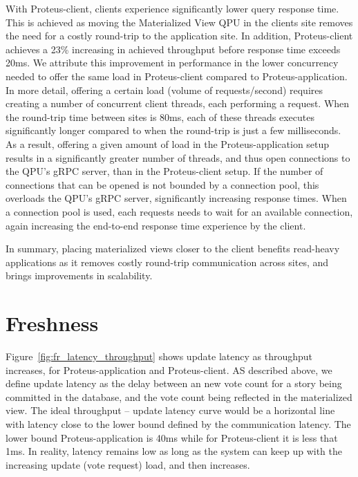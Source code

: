 With Proteus-client, clients experience significantly lower query response time.
This is achieved as moving the Materialized View QPU in the clients site removes the need for a costly round-trip to the
application site.
In addition, Proteus-client achieves a 23\% increasing in achieved throughput before response time exceeds 20ms.
We attribute this improvement in performance in the lower concurrency needed to offer the same load in Proteus-client
compared to Proteus-application.
In more detail, offering a certain load (volume of requests/second) requires creating a number of concurrent client threads,
each performing a request.
When the round-trip time between sites is 80ms, each of these threads executes significantly longer compared to
when the round-trip is just a few milliseconds.
As a result, offering a given amount of load in the Proteus-application setup results in a significantly greater number
of threads, and thus open connections to the QPU's gRPC server, than in the Proteus-client setup.
If the number of connections that can be opened is not bounded by a connection pool, this overloads the QPU's gRPC server,
significantly increasing response times.
When a connection pool is used, each requests needs to wait for an available connection,
again increasing the end-to-end response time experience by the client.

\medskip
\noindent
In summary, placing materialized views closer to the client benefits read-heavy applications as it removes costly round-trip
communication across sites, and brings improvements in scalability.

\section{Freshness}

Figure~\ref{fig:fr_latency_throughput} shows update latency as throughput increases, for Proteus-application and Proteus-client.
AS described above, we define update latency as the delay between an new vote count for a story being committed in the
database, and the vote count being reflected in the materialized view.
The ideal throughput -- update latency curve would be a horizontal line with latency close to the lower bound defined by
the communication latency.
The lower bound Proteus-application is 40ms while for Proteus-client it is less that 1ms.
In reality, latency remains low as long as the system can keep up with the increasing update (vote request) load,
and then increases.

